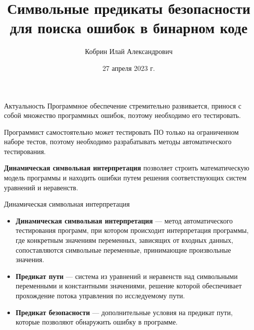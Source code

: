 \documentclass[10pt]{beamer}
\title{Символьные предикаты безопасности для поиска ошибок в бинарном коде}
\date{27 апреля 2023 г.}
\author{Кобрин Илай Александрович}
\institute{МГУ им. М.В. Ломоносова \\
Факультет вычислительной математики и кибернетики \\
Кафедра системного программирования}
\begin{document}
\maketitle

\begin{frame}{Актуальность}
Программное обеспечение стремительно развивается, принося с собой множество
программных ошибок, поэтому необходимо его тестировать.

Программист самостоятельно может тестировать ПО только на ограниченном наборе
тестов, поэтому необходимо разрабатывать методы автоматического тестирования.

\textbf{Динамическая символьная интерпретация} позволяет строить математическую
модель программы и находить ошибки путем решения соответствующих систем уравнений и неравенств.
\end{frame}

\begin{frame}{Динамическая символьная интерпретация}
\begin{itemize}
    \item \textbf{Динамическая символьная интерпретация} --- метод автоматического тестирования
        программ, при котором происходит интерпретация программы, где конкретным
        значениям переменных, зависящих от входных данных, сопоставляются
        символьные переменные, принимающие произвольные значения.
    \item \textbf{Предикат пути} --- система из уравнений и неравенств над
        символьными переменными и константными значениями, решение которой
        обеспечивает прохождение потока управления по исследуемому пути.
    \item \textbf{Предикат безопасности} --- дополнительные условия на предикат пути,
        которые позволяют обнаружить ошибку в программе.
\end{itemize}
\end{frame}
\end{document}
